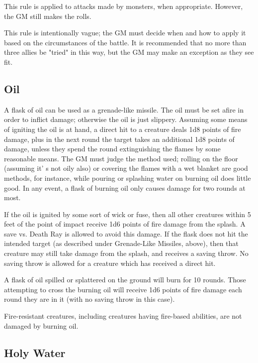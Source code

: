 \documentclass[a4paper,twoside,openany,10pt]{book}
\begin{document}
\begin{multicols}{2}
This rule is applied to attacks made by monsters, when appropriate. However, the GM still makes the rolls.

This rule is intentionally vague; the GM must decide when and how to apply it based on the circumstances of the battle. It is recommended that no more than three allies be "tried" in this way, but the GM may make an exception as they see fit.

\subsection{Oil}\label{oil}

A flask of oil can be used as a grenade-like missile. The oil must be set afire in order to inflict damage; otherwise the oil is just slippery. Assuming some means of igniting the oil is at hand, a direct hit to a creature deals 1d8 points of fire damage, plus in the next round the target takes an additional 1d8 points of damage, unless they spend the round extinguishing the flames by some reasonable means. The GM must judge the method used; rolling on the floor (assuming it' s not oily also) or covering the flames with a wet blanket are good methods, for instance, while pouring or splashing water on burning oil does little good. In any event, a flask of burning oil only causes damage for two rounds at most.

If the oil is ignited by some sort of wick or fuse, then all other creatures within 5 feet of the point of impact receive 1d6 points of fire damage from the splash. A save vs. Death Ray is allowed to avoid this damage. If the flask does not hit the intended target (as described under Grenade-Like Missiles, above), then that creature may still take damage from the splash, and receives a saving throw. No saving throw is allowed for a creature which has received a direct hit.

A flask of oil spilled or splattered on the ground will burn for 10 rounds. Those attempting to cross the burning oil will receive 1d6 points of fire damage each round they are in it (with no saving throw in this case).

Fire-resistant creatures, including creatures having fire-based abilities, are not damaged by burning oil.

\subsection{Holy Water}\label{holy-water}


\end{multicols}
\end{document}
